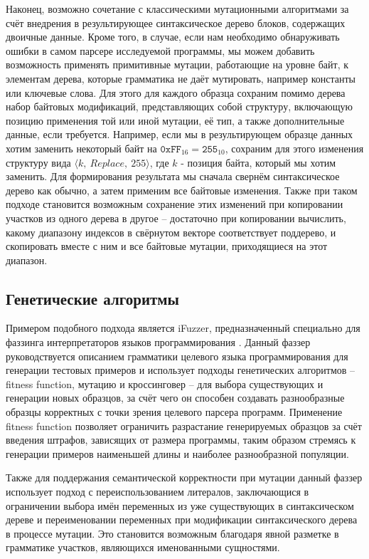 Наконец, возможно сочетание с классическими мутационными алгоритмами за счёт внедрения в результирующее синтаксическое дерево блоков, содержащих двоичные данные. Кроме того, в случае, если нам необходимо обнаруживать ошибки в самом парсере исследуемой программы, мы можем добавить возможность применять примитивные мутации, работающие на уровне байт, к элементам дерева, которые грамматика не даёт мутировать, например константы или ключевые слова. Для этого для каждого образца сохраним помимо дерева набор байтовых модификаций, представляющих собой структуру, включающую позицию применения той или иной мутации, её тип, а также дополнительные данные, если требуется. Например, если мы в результирующем образце данных хотим заменить некоторый байт на $\mathtt{0xFF}_{16} = \mathtt{255}_{10}$, сохраним для этого изменения структуру вида $\langle k, \ Replace, \ 255 \rangle$, где $k$ - позиция байта, который мы хотим заменить. Для формирования результата мы сначала свернём синтаксическое дерево как обычно, а затем применим все байтовые изменения. Также при таком подходе становится возможным сохранение этих изменений при копировании участков из одного дерева в другое -- достаточно при копировании вычислить, какому диапазону индексов в свёрнутом векторе соответствует поддерево, и скопировать вместе с ним и все байтовые мутации, приходящиеся на этот диапазон.

\subsection{Генетические алгоритмы}


Примером подобного подхода является iFuzzer, предназначенный специально для фаззинга интерпретаторов языков программирования \cite{ifuzzer}. Данный фаззер руководствуется описанием грамматики целевого языка программирования для генерации тестовых примеров и использует подходы генетических алгоритмов -- fitness function, мутацию и кроссинговер -- для выбора существующих и генерации новых образцов, за счёт чего он способен создавать разнообразные образцы корректных с точки зрения целевого парсера программ. Применение fitness function позволяет ограничить разрастание генерируемых образцов за счёт введения штрафов, зависящих от размера программы, таким образом стремясь к генерации примеров наименьшей длины и наиболее разнообразной популяции.

Также для поддержания семантической корректности при мутации данный фаззер использует подход с переиспользованием литералов, заключающися в ограничении выбора имён переменных из уже существующих в синтаксическом дереве и переименовании переменных при модификации синтаксического дерева в процессе мутации. Это становится возможным благодаря явной разметке в грамматике участков, являющихся именованными сущностями.
